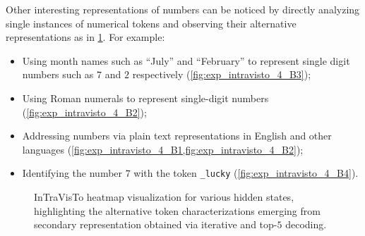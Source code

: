 Other interesting representations of numbers can be noticed by directly analyzing single instances of numerical tokens and observing their alternative representations as in \cref{fig:exp_intravisto_4_B}.
For example:
\begin{itemize}
    \item Using month names such as ``July'' and ``February'' to represent single digit numbers such as $7$ and $2$ respectively (\cref{fig:exp_intravisto_4_B3});
    \item Using Roman numerals to represent single-digit numbers (\cref{fig:exp_intravisto_4_B2});
    \item Addressing numbers via plain text representations in English and other languages (\cref{fig:exp_intravisto_4_B1,fig:exp_intravisto_4_B2});
    \item Identifying the number $7$ with the token \texttt{\_lucky} (\cref{fig:exp_intravisto_4_B4}).
\end{itemize}

\begin{figure}[t!]
    \centering
    \begingroup
    \captionsetup{width=0.8\textwidth/2}
    \quad
    \endgroup
    \caption[InTraVisTo heatmap visualization for various hidden states.]{InTraVisTo heatmap visualization for various hidden states, highlighting the alternative token characterizations emerging from secondary representation obtained via iterative and top-$5$ decoding.}
    \label{fig:exp_intravisto_4_B}
\end{figure}

